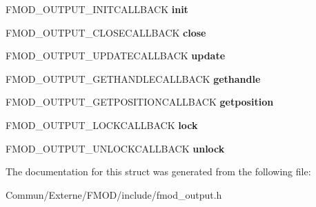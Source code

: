 \begin{DoxyCompactItemize}
\item 
F\+M\+O\+D\+\_\+\+O\+U\+T\+P\+U\+T\+\_\+\+I\+N\+I\+T\+C\+A\+L\+L\+B\+A\+CK {\bfseries init}\hypertarget{struct_f_m_o_d___o_u_t_p_u_t___d_e_s_c_r_i_p_t_i_o_n_a16015d5d334e75322b95adebaac20139}{}\label{struct_f_m_o_d___o_u_t_p_u_t___d_e_s_c_r_i_p_t_i_o_n_a16015d5d334e75322b95adebaac20139}

\item 
F\+M\+O\+D\+\_\+\+O\+U\+T\+P\+U\+T\+\_\+\+C\+L\+O\+S\+E\+C\+A\+L\+L\+B\+A\+CK {\bfseries close}\hypertarget{struct_f_m_o_d___o_u_t_p_u_t___d_e_s_c_r_i_p_t_i_o_n_a5e0e9b99b7b8011bb248e58ad82b4fa8}{}\label{struct_f_m_o_d___o_u_t_p_u_t___d_e_s_c_r_i_p_t_i_o_n_a5e0e9b99b7b8011bb248e58ad82b4fa8}

\item 
F\+M\+O\+D\+\_\+\+O\+U\+T\+P\+U\+T\+\_\+\+U\+P\+D\+A\+T\+E\+C\+A\+L\+L\+B\+A\+CK {\bfseries update}\hypertarget{struct_f_m_o_d___o_u_t_p_u_t___d_e_s_c_r_i_p_t_i_o_n_a3c61df7f0da61edd058317a0966c04bf}{}\label{struct_f_m_o_d___o_u_t_p_u_t___d_e_s_c_r_i_p_t_i_o_n_a3c61df7f0da61edd058317a0966c04bf}

\item 
F\+M\+O\+D\+\_\+\+O\+U\+T\+P\+U\+T\+\_\+\+G\+E\+T\+H\+A\+N\+D\+L\+E\+C\+A\+L\+L\+B\+A\+CK {\bfseries gethandle}\hypertarget{struct_f_m_o_d___o_u_t_p_u_t___d_e_s_c_r_i_p_t_i_o_n_a2029938a3daf763ac99e971bf0a4ce40}{}\label{struct_f_m_o_d___o_u_t_p_u_t___d_e_s_c_r_i_p_t_i_o_n_a2029938a3daf763ac99e971bf0a4ce40}

\item 
F\+M\+O\+D\+\_\+\+O\+U\+T\+P\+U\+T\+\_\+\+G\+E\+T\+P\+O\+S\+I\+T\+I\+O\+N\+C\+A\+L\+L\+B\+A\+CK {\bfseries getposition}\hypertarget{struct_f_m_o_d___o_u_t_p_u_t___d_e_s_c_r_i_p_t_i_o_n_ae8b8332e832ea9d12c45a48dd0481e9e}{}\label{struct_f_m_o_d___o_u_t_p_u_t___d_e_s_c_r_i_p_t_i_o_n_ae8b8332e832ea9d12c45a48dd0481e9e}

\item 
F\+M\+O\+D\+\_\+\+O\+U\+T\+P\+U\+T\+\_\+\+L\+O\+C\+K\+C\+A\+L\+L\+B\+A\+CK {\bfseries lock}\hypertarget{struct_f_m_o_d___o_u_t_p_u_t___d_e_s_c_r_i_p_t_i_o_n_a906c1cdb6636db105538db27b48cc513}{}\label{struct_f_m_o_d___o_u_t_p_u_t___d_e_s_c_r_i_p_t_i_o_n_a906c1cdb6636db105538db27b48cc513}

\item 
F\+M\+O\+D\+\_\+\+O\+U\+T\+P\+U\+T\+\_\+\+U\+N\+L\+O\+C\+K\+C\+A\+L\+L\+B\+A\+CK {\bfseries unlock}\hypertarget{struct_f_m_o_d___o_u_t_p_u_t___d_e_s_c_r_i_p_t_i_o_n_adeb7eea407c7b5b167d0cd30c6ef4a9f}{}\label{struct_f_m_o_d___o_u_t_p_u_t___d_e_s_c_r_i_p_t_i_o_n_adeb7eea407c7b5b167d0cd30c6ef4a9f}

\end{DoxyCompactItemize}


The documentation for this struct was generated from the following file\+:\begin{DoxyCompactItemize}
\item 
Commun/\+Externe/\+F\+M\+O\+D/include/fmod\+\_\+output.\+h\end{DoxyCompactItemize}
